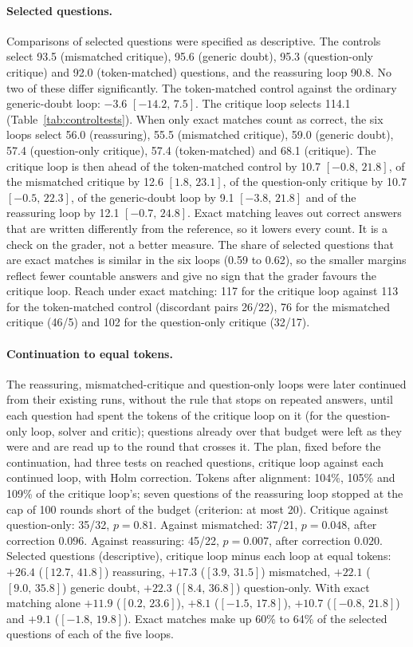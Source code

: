 \documentclass[11pt]{article}
\newcommand{\ci}[2]{$[#1,\,#2]$}
\begin{document}
\paragraph{Selected questions.}
Comparisons of selected questions were specified as descriptive.
The controls select 93.5 (mismatched critique), 95.6 (generic doubt), 95.3 (question-only critique) and 92.0 (token-matched) questions, and the reassuring loop 90.8. No two of these differ significantly.
The token-matched control against the ordinary generic-doubt loop: $-3.6$ \ci{-14.2}{7.5}.
The critique loop selects 114.1 (Table~\ref{tab:controltests}).
When only exact matches count as correct, the six loops select 56.0 (reassuring), 55.5 (mismatched critique), 59.0 (generic doubt), 57.4 (question-only critique), 57.4 (token-matched) and 68.1 (critique).
The critique loop is then ahead of the token-matched control by 10.7 \ci{-0.8}{21.8}, of the mismatched critique by 12.6 \ci{1.8}{23.1}, of the question-only critique by 10.7 \ci{-0.5}{22.3}, of the generic-doubt loop by 9.1 \ci{-3.8}{21.8} and of the reassuring loop by 12.1 \ci{-0.7}{24.8}.
Exact matching leaves out correct answers that are written differently from the reference, so it lowers every count. It is a check on the grader, not a better measure.
The share of selected questions that are exact matches is similar in the six loops (0.59 to 0.62), so the smaller margins reflect fewer countable answers and give no sign that the grader favours the critique loop.
Reach under exact matching: 117 for the critique loop against 113 for the token-matched control (discordant pairs 26/22), 76 for the mismatched critique (46/5) and 102 for the question-only critique (32/17).

\paragraph{Continuation to equal tokens.}
The reassuring, mismatched-critique and question-only loops were later continued from their existing runs, without the rule that stops on repeated answers, until each question had spent the tokens of the critique loop on it (for the question-only loop, solver and critic); questions already over that budget were left as they were and are read up to the round that crosses it.
The plan, fixed before the continuation, had three tests on reached questions, critique loop against each continued loop, with Holm correction.
Tokens after alignment: 104\%, 105\% and 109\% of the critique loop's; seven questions of the reassuring loop stopped at the cap of 100 rounds short of the budget (criterion: at most 20).
Critique against question-only: 35/32, $p=0.81$.
Against mismatched: 37/21, $p=0.048$, after correction $0.096$.
Against reassuring: 45/22, $p=0.007$, after correction $0.020$.
Selected questions (descriptive), critique loop minus each loop at equal tokens: $+26.4$ (\ci{12.7}{41.8}) reassuring, $+17.3$ (\ci{3.9}{31.5}) mismatched, $+22.1$ (\ci{9.0}{35.8}) generic doubt, $+22.3$ (\ci{8.4}{36.8}) question-only. With exact matching alone $+11.9$ (\ci{0.2}{23.6}), $+8.1$ (\ci{-1.5}{17.8}), $+10.7$ (\ci{-0.8}{21.8}) and $+9.1$ (\ci{-1.8}{19.8}).
Exact matches make up 60\% to 64\% of the selected questions of each of the five loops.
\end{document}
